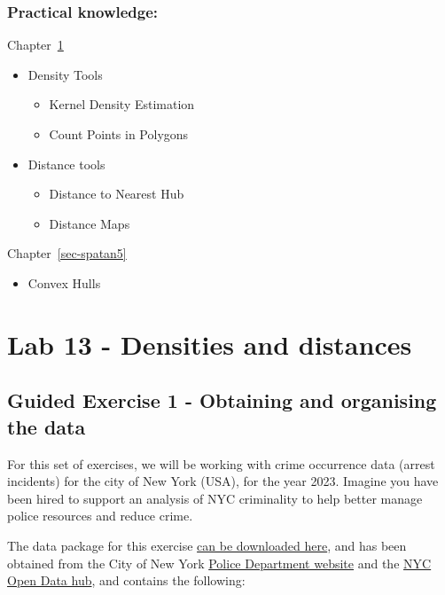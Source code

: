 \documentclass[
  letterpaper,
  DIV=11,
  numbers=noendperiod]{scrreprt}
\providecommand{\tightlist}{%
  \setlength{\itemsep}{0pt}\setlength{\parskip}{0pt}}\usepackage{longtable,booktabs,array}
\begin{document}
\subsection*{Practical knowledge:}\label{practical-knowledge-6}

Chapter~\ref{sec-spatan4}

\begin{itemize}
\tightlist
\item
  Density Tools

  \begin{itemize}
  \tightlist
  \item
    Kernel Density Estimation
  \item
    Count Points in Polygons
  \end{itemize}
\item
  Distance tools

  \begin{itemize}
  \tightlist
  \item
    Distance to Nearest Hub
  \item
    Distance Maps
  \end{itemize}
\end{itemize}

Chapter~\ref{sec-spatan5}

\begin{itemize}
\tightlist
\item
  Convex Hulls
\end{itemize}

\chapter{Lab 13 - Densities and distances}\label{sec-spatan4}

\section{Guided Exercise 1 - Obtaining and organising the
data}\label{guided-exercise-1---obtaining-and-organising-the-data}

For this set of exercises, we will be working with crime occurrence data
(arrest incidents) for the city of New York (USA), for the year 2023.
Imagine you have been hired to support an analysis of NYC criminality to
help better manage police resources and reduce crime.

The data package for this exercise
\href{https://stir-my.sharepoint.com/:u:/g/personal/ala2_stir_ac_uk/EV4-dGBg819Al09dLzpJa7YBz1tERVtYuY6gaIqxLrkBGA?e=W5gSgV}{can
be downloaded here}, and has been obtained from the City of New York
\href{https://www.nyc.gov/site/nypd/stats/crime-statistics/citywide-crime-stats.page}{Police
Department website} and the
\href{https://opendata.cityofnewyork.us/}{NYC Open Data hub}, and
contains the following:
\end{document}
